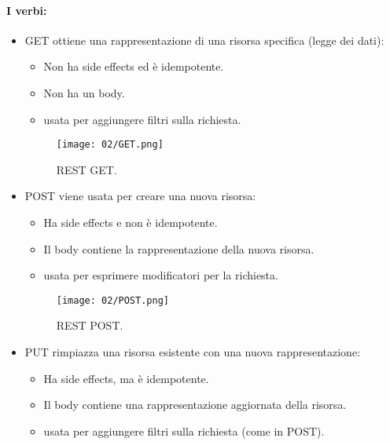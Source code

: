 
\paragraph{I verbi:}

\begin{itemize}
	\item GET ottiene una rappresentazione di una risorsa specifica (legge dei dati):
	      \begin{itemize}
		      \item Non ha side effects ed è idempotente.
		      \item Non ha un body.
		      \item {} usata per aggiungere filtri sulla richiesta.
	      \end{itemize}

	      \begin{figure}[h]
		      \centering
		      \texttt{[image: 02/GET.png]}
		      \caption{REST GET.}
	      \end{figure}

	\item POST viene usata per creare una nuova risorsa:
	      \begin{itemize}
		      \item Ha side effects e non è idempotente.
		      \item Il body contiene la rappresentazione della nuova risorsa.
		      \item {} usata per esprimere modificatori per la richiesta.

	      \end{itemize}

	      \begin{figure}[h]
		      \centering
		      \texttt{[image: 02/POST.png]}
		      \caption{REST POST.}
	      \end{figure}

	\item PUT rimpiazza una risorsa esistente con una nuova rappresentazione:
	      \begin{itemize}
		      \item Ha side effects, ma è idempotente.
		      \item Il body contiene una rappresentazione aggiornata della risorsa.
		      \item {} usata per aggiungere filtri sulla richiesta (come in POST).


\end{itemize}
\end{itemize}

